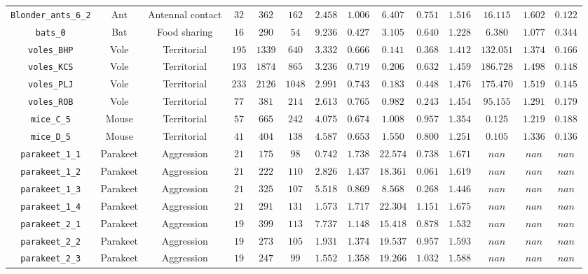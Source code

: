 \documentclass[10pt]{article}
\begin{document}
\begin{landscape}
\begin{table}[t]
\begin{tabular}{c|ccccccccccccc}
\verb|Blonder_ants_6_2| & Ant & Antennal contact & $32$ & $362$ & $162$ & $2.458$ & $1.006$ & $6.407$ & $0.751$ & $1.516$ & $16.115$ & $1.602$ & $0.122$\\
\verb|bats_0| & Bat & Food sharing & $16$ & $290$ & $54$ & $9.236$ & $0.427$ & $3.105$ & $0.640$ & $1.228$ & $6.380$ & $1.077$ & $0.344$\\
\verb|voles_BHP| & Vole & Territorial & $195$ & $1339$ & $640$ & $3.332$ & $0.666$ & $0.141$ & $0.368$ & $1.412$ & $132.051$ & $1.374$ & $0.166$\\
\verb|voles_KCS| & Vole & Territorial & $193$ & $1874$ & $865$ & $3.236$ & $0.719$ & $0.206$ & $0.632$ & $1.459$ & $186.728$ & $1.498$ & $0.148$\\
\verb|voles_PLJ| & Vole & Territorial & $233$ & $2126$ & $1048$ & $2.991$ & $0.743$ & $0.183$ & $0.448$ & $1.476$ & $175.470$ & $1.519$ & $0.145$\\
\verb|voles_ROB| & Vole & Territorial & $77$ & $381$ & $214$ & $2.613$ & $0.765$ & $0.982$ & $0.243$ & $1.454$ & $95.155$ & $1.291$ & $0.179$\\
\verb|mice_C_5| & Mouse & Territorial & $57$ & $665$ & $242$ & $4.075$ & $0.674$ & $1.008$ & $0.957$ & $1.354$ & $0.125$ & $1.219$ & $0.188$\\
\verb|mice_D_5| & Mouse & Territorial & $41$ & $404$ & $138$ & $4.587$ & $0.653$ & $1.550$ & $0.800$ & $1.251$ & $0.105$ & $1.336$ & $0.136$\\
\verb|parakeet_1_1| & Parakeet & Aggression & $21$ & $175$ & $98$ & $0.742$ & $1.738$ & $22.574$ & $0.738$ & $1.671$ & $nan$ & $nan$ & $nan$\\
\verb|parakeet_1_2| & Parakeet & Aggression & $21$ & $222$ & $110$ & $2.826$ & $1.437$ & $18.361$ & $0.061$ & $1.619$ & $nan$ & $nan$ & $nan$\\
\verb|parakeet_1_3| & Parakeet & Aggression & $21$ & $325$ & $107$ & $5.518$ & $0.869$ & $8.568$ & $0.268$ & $1.446$ & $nan$ & $nan$ & $nan$\\
\verb|parakeet_1_4| & Parakeet & Aggression & $21$ & $291$ & $131$ & $1.573$ & $1.717$ & $22.304$ & $1.151$ & $1.675$ & $nan$ & $nan$ & $nan$\\
\verb|parakeet_2_1| & Parakeet & Aggression & $19$ & $399$ & $113$ & $7.737$ & $1.148$ & $15.418$ & $0.878$ & $1.532$ & $nan$ & $nan$ & $nan$\\
\verb|parakeet_2_2| & Parakeet & Aggression & $19$ & $273$ & $105$ & $1.931$ & $1.374$ & $19.537$ & $0.957$ & $1.593$ & $nan$ & $nan$ & $nan$\\
\verb|parakeet_2_3| & Parakeet & Aggression & $19$ & $247$ & $99$ & $1.552$ & $1.358$ & $19.266$ & $1.032$ & $1.588$ & $nan$ & $nan$ & $nan$\\

\end{tabular}
\end{table}
\end{landscape}
\end{document}
